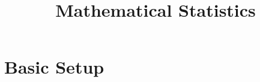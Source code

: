 \documentclass[twoside, a4paper, 10pt]{amsart}
\title[ ]{Mathematical Statistics}
\begin{document}
\maketitle
\raggedbottom


\newcommand{\cA}{\mathcal{A}}
\newcommand{\cB}{\mathcal{B}}
\newcommand{\cC}{\mathcal{C}}
\newcommand{\cD}{\mathcal{D}}
\newcommand{\cE}{\mathcal{E}}
\newcommand{\cF}{\mathcal{F}}
\newcommand{\cG}{\mathcal{G}}
\newcommand{\cH}{\mathcal{H}}
\newcommand{\cI}{\mathcal{I}}
\newcommand{\cJ}{\mathcal{J}}
\newcommand{\cK}{\mathcal{K}}
\newcommand{\cL}{\mathcal{L}}
\newcommand{\cM}{\mathcal{M}}
\newcommand{\cN}{\mathcal{N}}
\newcommand{\cO}{\mathcal{O}}
\newcommand{\cP}{\mathcal{P}}
\newcommand{\cQ}{\mathcal{Q}}
\newcommand{\cR}{\mathcal{R}}
\newcommand{\cS}{\mathcal{S}}
\newcommand{\cT}{\mathcal{T}}
\newcommand{\cU}{\mathcal{U}}
\newcommand{\cV}{\mathcal{V}}
\newcommand{\cW}{\mathcal{W}}
\newcommand{\cX}{\mathcal{X}}
\newcommand{\cY}{\mathcal{Y}}
\newcommand{\cZ}{\mathcal{Z}}
\newcommand{\bA}{\mathbb{A}}
\newcommand{\bB}{\mathbb{B}}
\newcommand{\bC}{\mathbb{C}}
\newcommand{\bD}{\mathbb{D}}
\newcommand{\bE}{\mathbb{E}}
\newcommand{\bF}{\mathbb{F}}
\newcommand{\bG}{\mathbb{G}}
\newcommand{\bH}{\mathbb{H}}
\newcommand{\bI}{\mathbb{I}}
\newcommand{\bJ}{\mathbb{J}}
\newcommand{\bK}{\mathbb{K}}
\newcommand{\bL}{\mathbb{L}}
\newcommand{\bM}{\mathbb{M}}
\newcommand{\bN}{\mathbb{N}}
\newcommand{\bO}{\mathbb{O}}
\newcommand{\bP}{\mathbb{P}}
\newcommand{\bQ}{\mathbb{Q}}
\newcommand{\bR}{\mathbb{R}}
\newcommand{\bS}{\mathbb{S}}
\newcommand{\bT}{\mathbb{T}}
\newcommand{\bU}{\mathbb{U}}
\newcommand{\bV}{\mathbb{V}}
\newcommand{\bW}{\mathbb{W}}
\newcommand{\bX}{\mathbb{X}}
\newcommand{\bY}{\mathbb{Y}}
\newcommand{\bZ}{\mathbb{Z}}


 

\theoremstyle{definition}
\newtheorem{mydef}[dummy]{Definition}
\newtheorem{prop}[dummy]{Proposition}
\newtheorem{corol}[dummy]{Corollary}
\newtheorem{thm}[dummy]{Theorem}
\newtheorem{lemma}[dummy]{Lemma}
\newtheorem{eg}[dummy]{Example}
\newtheorem{notation}[dummy]{Notation}
\newtheorem{remark}[dummy]{Remark}
\newtheorem{claim}[dummy]{Claim}
\newtheorem{Exercise}[dummy]{Exercise}
\newtheorem{question}[dummy]{Question}
\newtheorem{conjecture}[dummy]{Conjecture}

\tableofcontents

\section{Basic Setup}
\end{document}
